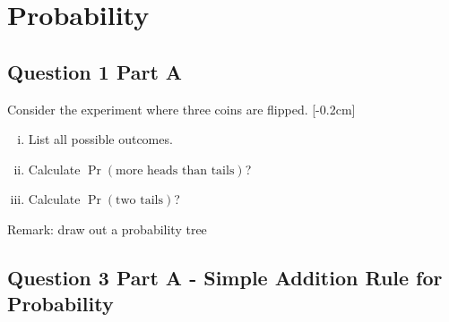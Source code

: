 \documentclass[]{report}
\begin{document}
%
%
%
%
%
%
%
%








\section*{Probability}
\subsection*{Question 1 Part A}

Consider the experiment where three coins are flipped. [-0.2cm]
\begin{enumerate}[(i)]
\item List all possible outcomes. \item  Calculate $\Pr(\text{more heads than tails})$? \item Calculate $\Pr(\text{two tails})$?
\end{enumerate}
Remark: draw out a probability tree


























\subsection*{Question 3 Part A - Simple Addition Rule for Probability}
\end{document}
